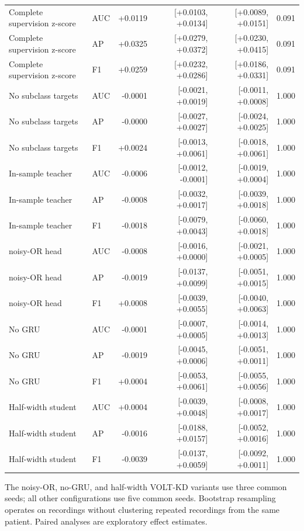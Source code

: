 \documentclass[11pt,a4paper]{article}
\begin{document}
\begin{table}[htbp]
\begin{tabularx}{\linewidth}{Ylrrrr}
Complete supervision z-score & AUC & +0.0119 & [+0.0103, +0.0134] & [+0.0089, +0.0151] & 0.091 \\
Complete supervision z-score & AP & +0.0325 & [+0.0279, +0.0372] & [+0.0230, +0.0415] & 0.091 \\
Complete supervision z-score & F1 & +0.0259 & [+0.0232, +0.0286] & [+0.0186, +0.0331] & 0.091 \\
No subclass targets & AUC & -0.0001 & [-0.0021, +0.0019] & [-0.0011, +0.0008] & 1.000 \\
No subclass targets & AP & -0.0000 & [-0.0027, +0.0027] & [-0.0024, +0.0025] & 1.000 \\
No subclass targets & F1 & +0.0024 & [-0.0013, +0.0061] & [-0.0018, +0.0061] & 1.000 \\
In-sample teacher & AUC & -0.0006 & [-0.0012, -0.0001] & [-0.0019, +0.0004] & 1.000 \\
In-sample teacher & AP & -0.0008 & [-0.0032, +0.0017] & [-0.0039, +0.0018] & 1.000 \\
In-sample teacher & F1 & -0.0018 & [-0.0079, +0.0043] & [-0.0060, +0.0018] & 1.000 \\
noisy-OR head & AUC & -0.0008 & [-0.0016, +0.0000] & [-0.0021, +0.0005] & 1.000 \\
noisy-OR head & AP & -0.0019 & [-0.0137, +0.0099] & [-0.0051, +0.0015] & 1.000 \\
noisy-OR head & F1 & +0.0008 & [-0.0039, +0.0055] & [-0.0040, +0.0063] & 1.000 \\
No GRU & AUC & -0.0001 & [-0.0007, +0.0005] & [-0.0014, +0.0013] & 1.000 \\
No GRU & AP & -0.0019 & [-0.0045, +0.0006] & [-0.0051, +0.0011] & 1.000 \\
No GRU & F1 & +0.0004 & [-0.0053, +0.0061] & [-0.0055, +0.0056] & 1.000 \\
Half-width student & AUC & +0.0004 & [-0.0039, +0.0048] & [-0.0008, +0.0017] & 1.000 \\
Half-width student & AP & -0.0016 & [-0.0188, +0.0157] & [-0.0052, +0.0016] & 1.000 \\
Half-width student & F1 & -0.0039 & [-0.0137, +0.0059] & [-0.0092, +0.0011] & 1.000 \\
\bottomrule
\end{tabularx}

\end{table}

The noisy-OR, no-GRU, and half-width VOLT-KD variants use three common seeds; all other configurations use five common seeds. Bootstrap resampling operates on recordings without clustering repeated recordings from the same patient. Paired analyses are exploratory effect estimates.
\end{document}
